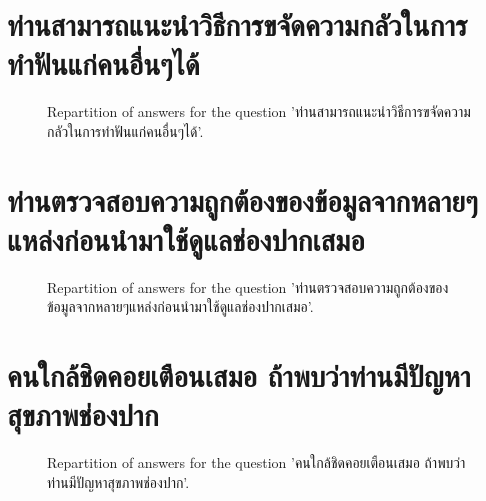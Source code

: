 \documentclass[12pt]{article}
\begin{document}
\clearpage{}
\section{ท่านสามารถแนะนำวิธีการขจัดความกลัวในการทำฟันแก่คนอื่นๆได้}

\label{sec:81}


\begin{figure}[h!]
    \caption{\label{figure:q81-1}Repartition of answers for the question 'ท่านสามารถแนะนำวิธีการขจัดความกลัวในการทำฟันแก่คนอื่นๆได้'.}
\end{figure}



\clearpage{}
\section{ท่านตรวจสอบความถูกต้องของข้อมูลจากหลายๆแหล่งก่อนนำมาใช้ดูแลช่องปากเสมอ}

\label{sec:82}


\begin{figure}[h!]
    \caption{\label{figure:q82-1}Repartition of answers for the question 'ท่านตรวจสอบความถูกต้องของข้อมูลจากหลายๆแหล่งก่อนนำมาใช้ดูแลช่องปากเสมอ'.}
\end{figure}



\clearpage{}
\section{คนใกล้ชิดคอยเตือนเสมอ ถ้าพบว่าท่านมีปัญหาสุขภาพช่องปาก}

\label{sec:83}


\begin{figure}[h!]
    \caption{\label{figure:q83-1}Repartition of answers for the question 'คนใกล้ชิดคอยเตือนเสมอ ถ้าพบว่าท่านมีปัญหาสุขภาพช่องปาก'.}
\end{figure}
\end{document}
